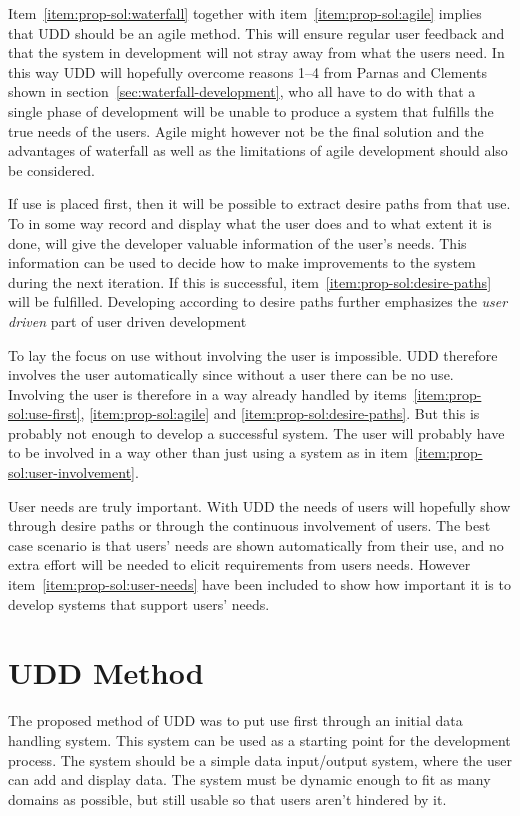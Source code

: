 \documentclass[a4paper]{report}
\begin{document}
Item~\ref{item:prop-sol:waterfall} together with item~\ref{item:prop-sol:agile} implies that UDD should be an agile method. This will ensure regular user feedback and that the system in development will not stray away from what the users need. In this way UDD will hopefully overcome reasons 1--4 from Parnas and Clements~\cite{Parnas-Clements:1985} shown in section~\ref{sec:waterfall-development}, who all have to do with that a single phase of development will be unable to produce a system that fulfills the true needs of the users. Agile might however not be the final solution and the advantages of waterfall as well as the limitations of agile development should also be considered.

If use is placed first, then it will be possible to extract desire paths from that use. To in some way record and display what the user does and to what extent it is done, will give the developer valuable information of the user's needs. This information can be used to decide how to make improvements to the system during the next iteration. If this is successful, item~\ref{item:prop-sol:desire-paths} will be fulfilled. Developing according to desire paths further emphasizes the \emph{user driven} part of user driven development

To lay the focus on use without involving the user is impossible. UDD therefore involves the user automatically since without a user there can be no use. Involving the user is therefore in a way already handled by items~\ref{item:prop-sol:use-first}, \ref{item:prop-sol:agile} and \ref{item:prop-sol:desire-paths}. But this is probably not enough to develop a successful system. The user will probably have to be involved in a way other than just using a system as in item~\ref{item:prop-sol:user-involvement}.

User needs are truly important. With UDD the needs of users will hopefully show through desire paths or through the continuous involvement of users. The best case scenario is that users' needs are shown automatically from their use, and no extra effort will be needed to elicit requirements from users needs. However item~\ref{item:prop-sol:user-needs} have been included to show how important it is to develop systems that support users' needs.

\section{UDD Method}
The proposed method of UDD was to put use first through an initial data handling system. This system can be used as a starting point for the development process. The system should be a simple data input/output system, where the user can add and display data. The system must be dynamic enough to fit as many domains as possible, but still usable so that users aren't hindered by it.
\end{document}
